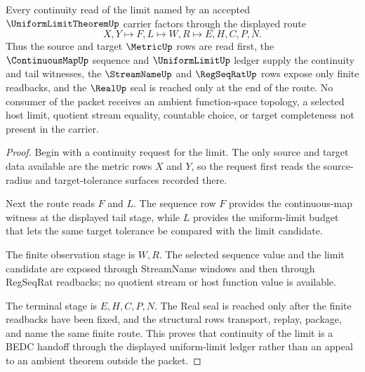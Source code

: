 \begin{theorem}
\label{thm:uniform-limit-theorem-continuous-handoff}
Every continuity read of the limit named by an accepted $\UniformLimitTheoremUp$ carrier factors through the displayed route
$$
X,Y \longmapsto F,L \longmapsto W,R \longmapsto E,H,C,P,N .
$$
Thus the source and target $\MetricUp$ rows are read first, the $\ContinuousMapUp$ sequence and $\UniformLimitUp$ ledger supply the continuity and tail witnesses, the $\StreamNameUp$ and $\RegSeqRatUp$ rows expose only finite readbacks, and the $\RealUp$ seal is reached only at the end of the route. No consumer of the packet receives an ambient function-space topology, a selected host limit, quotient stream equality, countable choice, or target completeness not present in the carrier.
\end{theorem}
\begin{proof}
Begin with a continuity request for the limit. The only source and target data available are the metric rows $X$ and $Y$, so the request first reads the source-radius and target-tolerance surfaces recorded there.

Next the route reads $F$ and $L$. The sequence row $F$ provides the continuous-map witness at the displayed tail stage, while $L$ provides the uniform-limit budget that lets the same target tolerance be compared with the limit candidate.

The finite observation stage is $W,R$. The selected sequence value and the limit candidate are exposed through StreamName windows and then through RegSeqRat readbacks; no quotient stream or host function value is available.

The terminal stage is $E,H,C,P,N$. The Real seal is reached only after the finite readbacks have been fixed, and the structural rows transport, replay, package, and name the same finite route. This proves that continuity of the limit is a BEDC handoff through the displayed uniform-limit ledger rather than an appeal to an ambient theorem outside the packet.
\end{proof}

